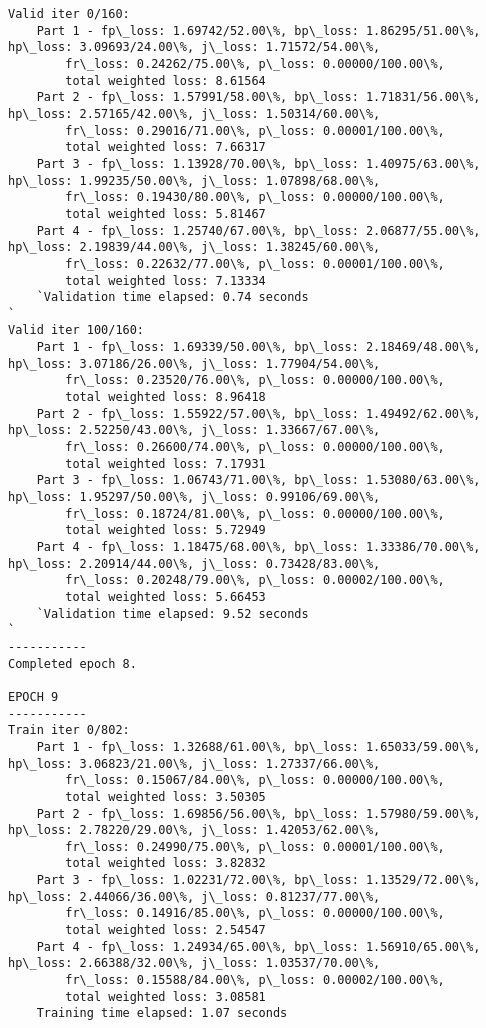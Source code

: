 \documentclass[11pt]{article}
\begin{document}
\begin{Verbatim}[commandchars=\\\{\}]
Valid iter 0/160:
	Part 1 - fp\_loss: 1.69742/52.00\%, bp\_loss: 1.86295/51.00\%, hp\_loss: 3.09693/24.00\%, j\_loss: 1.71572/54.00\%, 
		fr\_loss: 0.24262/75.00\%, p\_loss: 0.00000/100.00\%, 
		total weighted loss: 8.61564
	Part 2 - fp\_loss: 1.57991/58.00\%, bp\_loss: 1.71831/56.00\%, hp\_loss: 2.57165/42.00\%, j\_loss: 1.50314/60.00\%, 
		fr\_loss: 0.29016/71.00\%, p\_loss: 0.00001/100.00\%, 
		total weighted loss: 7.66317
	Part 3 - fp\_loss: 1.13928/70.00\%, bp\_loss: 1.40975/63.00\%, hp\_loss: 1.99235/50.00\%, j\_loss: 1.07898/68.00\%, 
		fr\_loss: 0.19430/80.00\%, p\_loss: 0.00000/100.00\%, 
		total weighted loss: 5.81467
	Part 4 - fp\_loss: 1.25740/67.00\%, bp\_loss: 2.06877/55.00\%, hp\_loss: 2.19839/44.00\%, j\_loss: 1.38245/60.00\%, 
		fr\_loss: 0.22632/77.00\%, p\_loss: 0.00001/100.00\%, 
		total weighted loss: 7.13334
	`Validation time elapsed: 0.74 seconds
`
Valid iter 100/160:
	Part 1 - fp\_loss: 1.69339/50.00\%, bp\_loss: 2.18469/48.00\%, hp\_loss: 3.07186/26.00\%, j\_loss: 1.77904/54.00\%, 
		fr\_loss: 0.23520/76.00\%, p\_loss: 0.00000/100.00\%, 
		total weighted loss: 8.96418
	Part 2 - fp\_loss: 1.55922/57.00\%, bp\_loss: 1.49492/62.00\%, hp\_loss: 2.52250/43.00\%, j\_loss: 1.33667/67.00\%, 
		fr\_loss: 0.26600/74.00\%, p\_loss: 0.00000/100.00\%, 
		total weighted loss: 7.17931
	Part 3 - fp\_loss: 1.06743/71.00\%, bp\_loss: 1.53080/63.00\%, hp\_loss: 1.95297/50.00\%, j\_loss: 0.99106/69.00\%, 
		fr\_loss: 0.18724/81.00\%, p\_loss: 0.00000/100.00\%, 
		total weighted loss: 5.72949
	Part 4 - fp\_loss: 1.18475/68.00\%, bp\_loss: 1.33386/70.00\%, hp\_loss: 2.20914/44.00\%, j\_loss: 0.73428/83.00\%, 
		fr\_loss: 0.20248/79.00\%, p\_loss: 0.00002/100.00\%, 
		total weighted loss: 5.66453
	`Validation time elapsed: 9.52 seconds
`
-----------
Completed epoch 8.

EPOCH 9
-----------
Train iter 0/802:
	Part 1 - fp\_loss: 1.32688/61.00\%, bp\_loss: 1.65033/59.00\%, hp\_loss: 3.06823/21.00\%, j\_loss: 1.27337/66.00\%, 
		fr\_loss: 0.15067/84.00\%, p\_loss: 0.00000/100.00\%, 
		total weighted loss: 3.50305
	Part 2 - fp\_loss: 1.69856/56.00\%, bp\_loss: 1.57980/59.00\%, hp\_loss: 2.78220/29.00\%, j\_loss: 1.42053/62.00\%, 
		fr\_loss: 0.24990/75.00\%, p\_loss: 0.00001/100.00\%, 
		total weighted loss: 3.82832
	Part 3 - fp\_loss: 1.02231/72.00\%, bp\_loss: 1.13529/72.00\%, hp\_loss: 2.44066/36.00\%, j\_loss: 0.81237/77.00\%, 
		fr\_loss: 0.14916/85.00\%, p\_loss: 0.00000/100.00\%, 
		total weighted loss: 2.54547
	Part 4 - fp\_loss: 1.24934/65.00\%, bp\_loss: 1.56910/65.00\%, hp\_loss: 2.66388/32.00\%, j\_loss: 1.03537/70.00\%, 
		fr\_loss: 0.15588/84.00\%, p\_loss: 0.00002/100.00\%, 
		total weighted loss: 3.08581
	Training time elapsed: 1.07 seconds


\end{Verbatim}
\end{document}
